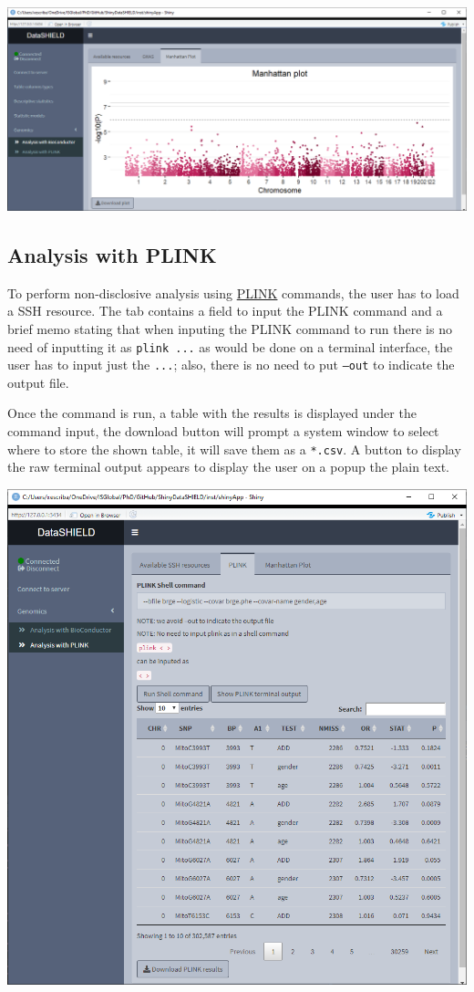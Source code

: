 \documentclass[
]{book}
\begin{document}
\includegraphics{images/genomics2.png}

\hypertarget{analysis-with-plink}{%
\subsection{Analysis with PLINK}\label{analysis-with-plink}}

To perform non-disclosive analysis using \href{http://zzz.bwh.harvard.edu/plink/index.shtml}{PLINK} commands, the user has to load a SSH resource. The tab contains a field to input the PLINK command and a brief memo stating that when inputing the PLINK command to run there is no need of inputting it as \texttt{plink\ ...} as would be done on a terminal interface, the user has to input just the \texttt{...}; also, there is no need to put \texttt{–out} to indicate the output file.

Once the command is run, a table with the results is displayed under the command input, the download button will prompt a system window to select where to store the shown table, it will save them as a \texttt{*.csv}. A button to display the raw terminal output appears to display the user on a popup the plain text.

\includegraphics{images/genomics3.png}
\end{document}
